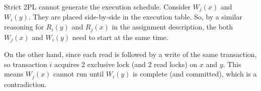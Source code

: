 Strict 2PL cannot generate the execution schedule.
Consider $W_j(x)$ and $W_i(y)$.
They are placed side-by-side in the execution table.
So, by a similar reasoning for $R_i(y)$ and $R_j(x)$ in the assignment description,  the both $W_j(x)$ and $W_i(y)$ need to start at the same time.

On the other hand, since each read is followed by a write of the same transaction, so transaction $i$ acquires 2 exclusive lock (and 2 read locks) on $x$ and $y$.
This means $W_j(x)$ cannot run until $W_i(y)$ is complete (and committed), which is a contradiction.
